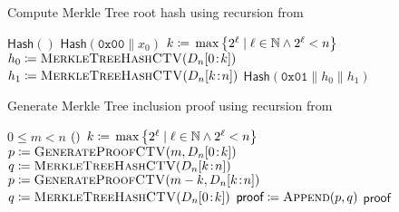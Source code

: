 \begin{algorithm}[p]
\caption{Compute Merkle Tree root hash using \gls{recursion}
    from~\cite{rfc9162}}
\label{alg:merkle_tree_ctv}
\begin{algorithmic}[1]
        \State \Return $\textsf{Hash}()$
        \State \Return $\textsf{Hash}(\texttt{0x00} \| x_{0})$
    \Else
        \State $k \coloneqq{}
            \max\left\{ 2^{\ell} \mid \ell\in\mathbb{N} \land 2^{\ell} < n \right\}$
        \State $h_{0} \coloneqq{}
            \textsc{MerkleTreeHashCTV}(D_{n}[0\!:\!k])$
        \State $h_{1} \coloneqq{}
            \textsc{MerkleTreeHashCTV}(D_{n}[k\!:\!n])$
        \State \Return $\textsf{Hash}(\texttt{0x01} \| h_{0} \| h_{1})$
    \EndIf
\EndProcedure
\end{algorithmic}
\end{algorithm}

\begin{algorithm}[p]
\caption{Generate Merkle Tree inclusion proof using \gls{recursion}
    from~\cite{rfc9162}}
\label{alg:merkle_proof_generate_ctv}
\begin{algorithmic}[1]
\Require $0\le m < n$
        \State \Return $\left(  \right)$
    \Else
        \State $k \coloneqq{}
            \max\left\{ 2^{\ell} \mid \ell\in\mathbb{N} \land 2^{\ell} < n \right\}$
            \State $p \coloneqq{}
                \textsc{GenerateProofCTV}(m, D_{n}[0\!:\!k])$
            \State $q \coloneqq{} 
                \textsc{MerkleTreeHashCTV}(D_{n}[k\!:\!n])$
        \Else
            \State $p \coloneqq{}
                \textsc{GenerateProofCTV}(m-k, D_{n}[k\!:\!n])$
            \State $q \coloneqq{} 
                \textsc{MerkleTreeHashCTV}(D_{n}[0\!:\!k])$
        \EndIf
        \State $\textsf{proof} \coloneqq{} \textsc{Append}(p, q)$
        \State \Return $\textsf{proof}$
    \EndIf
\EndProcedure
\end{algorithmic}
\end{algorithm}

